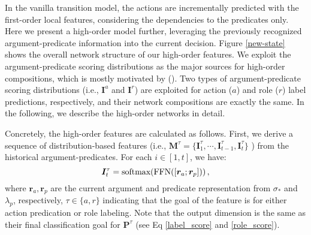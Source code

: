 \documentclass[letterpaper]{article} %
\begin{document}
\begin{CJK}{UTF8}{gbsn}
In the vanilla transition model, the actions are incrementally predicted with the first-order local features,
considering the dependencies to the predicates only.
Here we present a high-order model further, leveraging the previously recognized argument-predicate information into the current decision.
Figure \ref{new-state} shows the overall network structure of our high-order features.
We exploit the argument-predicate scoring distributions as the major sources for high-order compositions,
which is mostly motivated by \citeauthor{lyu-etal-2019-semantic} (\citeyear{lyu-etal-2019-semantic}).
Two types of argument-predicate scoring distributions (i.e., $\bm{I}^a$ and $\bm{I}^r$) are exploited for action ($a$) and role ($r$) label predictions, respectively,
and their network compositions are exactly the same.
In the following, we describe the high-order networks in detail.






Concretely, the high-order features are calculated as follows.
First, we derive a sequence of distribution-based features (i.e., $\bm{M}^{\tau}=\{\bm{I}^{\tau}_1,\cdots,\bm{I}^{\tau}_{t-1},\bm{I}^{\tau}_{t}\}$ ) from the historical argument-predicates.
For each $i \in [1, t]$, we have:
\begin{equation}
\setlength\abovedisplayskip{3pt}
\setlength\belowdisplayskip{3pt}
    \bm{I}^{\tau}_t = \text{softmax}(\text{FFN}([ \bm{r}_a ; \bm{r}_p])) \,,
\end{equation}
where $\bm{r}_a, \bm{r}_p$ are the current argument and predicate representation from $\sigma_{*}$ and $\lambda_p$, respectively,
${\tau}\in\{a, r\}$ indicating that the goal of the feature is for either action predication or role labeling.
Note that the output dimension is the same as their final classification goal for $\bm{P}^{\tau}$ (see Eq \ref{label_score} and \ref{role_score}).


\end{CJK}
\end{document}
